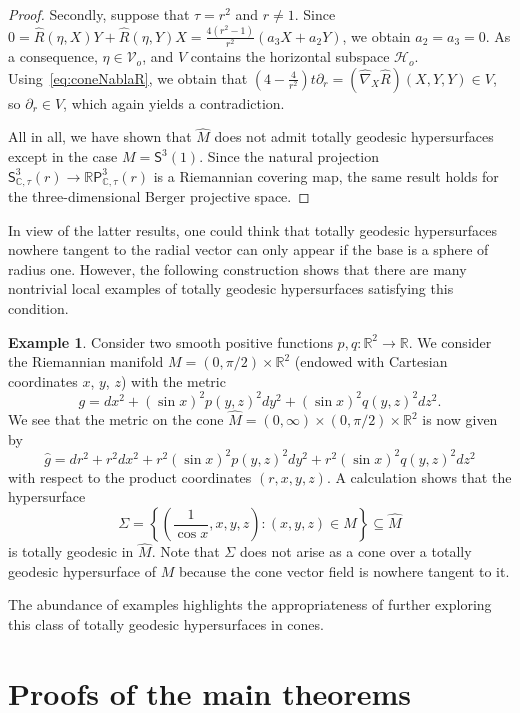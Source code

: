 \documentclass[11pt,a4paper,final]{amsart}
\newcommand{\s}{\mathsf}
\newcommand{\R}{\mathbb{R}}
\newcommand{\C}{\mathbb{C}}
\renewcommand{\hat}{\widehat}
\theoremstyle{definition}
\newtheorem{example}[theorem]{Example}
\begin{document}
\begin{proof}
	Secondly, suppose that $\tau=r^{2}$ and $r\neq 1$.
	Since $0=\hat{R}(\eta,X)Y+\hat{R}(\eta,Y)X=\frac{4(r^{2}-1)}{r^{2}}(a_{3}X+a_{2}Y)$, we obtain $a_{2}=a_{3}=0$.
	As a consequence, $\eta\in \mathcal{V}_{o}$, and $V$ contains the horizontal subspace $\mathcal{H}_{o}$.
	Using~\eqref{eq:coneNablaR}, we obtain that
	$
		\left( 4-\frac{4}{r^{2}} \right)t\partial_{r}=(\hat{\nabla}_{X}\hat{R})(X,Y,Y)\in V
	$,
	so $\partial_{r}\in V$, which again yields a contradiction.
	
	All in all, we have shown that $\hat{M}$ does not admit totally geodesic hypersurfaces except in the case $M=\s{S}^{3}(1)$.
	Since the natural projection $\s{S}^{3}_{\C,\tau}(r)\to\R\s{P}^{3}_{\C,\tau}(r)$ is a Riemannian covering map, the same result holds for the three-dimensional Berger projective space.
\end{proof}

In view of the latter results, one could think that totally geodesic hypersurfaces nowhere tangent to the radial vector can only appear if the base is a sphere of radius one.
However, the following construction shows that there are many nontrivial local examples of totally geodesic hypersurfaces satisfying this condition.
\begin{example}
	\label{ex:nontrivalexconetg}
	Consider two smooth positive functions $p,q\colon \R^2\to \R$. 
	We consider the Riemannian manifold $M=(0,\pi/2)\times \R^2$ (endowed with Cartesian coordinates $x$, $y$, $z$) with the metric
	\[
	g=dx^2+(\sin x)^2 p(y,z)^2 dy^2+(\sin x)^2 q(y,z)^2dz^2.
	\]
	We see that the metric on the cone $\hat{M}=(0,\infty)\times (0,\pi/2)\times\R^2$ is now given by
	\[
	\hat{g}=dr^2+r^2dx^2+r^2(\sin x)^2 p(y,z)^2 dy^2+r^2(\sin x)^2 q(y,z)^2dz^2
	\]
	with respect to the product coordinates $(r,x,y,z)$.
	A calculation shows that the hypersurface
	\[
	\Sigma=\left\{ \left(\frac{1}{\cos x},x,y,z\right)\colon (x,y,z)\in M \right\}\subseteq \hat{M}
	\]
	is totally geodesic in $\hat{M}$.
	Note that $\Sigma$ does not arise as a cone over a totally geodesic hypersurface of $M$ because the cone vector field is nowhere tangent to it.
\end{example}

The abundance of examples highlights the appropriateness of further exploring this class of totally geodesic hypersurfaces in cones.

\section{Proofs of the main theorems}\label{sec:mainths}
\end{document}
